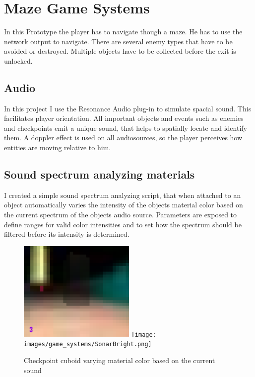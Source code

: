 
\chapter{Maze Game Systems}\label{MazeGameSystems}
 In this Prototype the player has to navigate though a maze. He has to use the network output to navigate. There are several enemy types that have to be avoided or destroyed. Multiple objects have to be collected before the exit is unlocked.

\section{Audio}
In this project I use the Resonance Audio plug-in to simulate spacial sound. This facilitates player orientation. All important objects and events such as enemies and checkpoints emit a unique sound, that helps to spatially locate and identify them. A doppler effect is used on all audiosources, so the player perceives how entities are moving relative to him.



\section{Sound spectrum analyzing materials}
I created a simple sound spectrum analyzing script, that when attached to an object automatically varies the intensity of the objects material color based on the current spectrum of the objects audio source. Parameters are exposed to define ranges for valid color intensities and to set how the spectrum should be filtered before its intensity is determined.

\begin{figure}
  \centering
  \includegraphics[width=0.5\textwidth]{images/game_systems/SonarDim.png}
  \texttt{[image: images/game\_systems/SonarBright.png]}
  \caption{Checkpoint cuboid varying material color based on the current sound}
  \label{SonarBlinks}
\end{figure}


